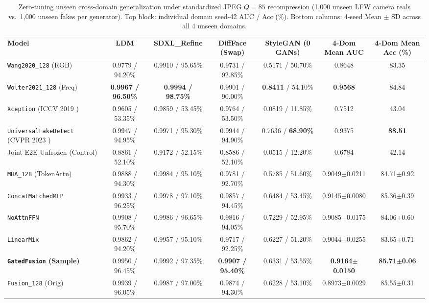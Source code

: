 \documentclass[fleqn,10pt]{wlscirep}
\begin{document}
\begin{table}[tbp]
\centering
\caption{Zero-tuning unseen cross-domain generalization under standardized JPEG $Q=85$ recompression (1,000 unseen LFW camera reals vs.\ 1,000 unseen fakes per generator). Top block: individual domain seed-42 AUC / Acc (\%). Bottom columns: 4-seed Mean $\pm$ SD across all 4 unseen domains.}
\label{tab:unseen}
\scriptsize
\begin{tabular}{@{}lcccccc@{}}
\toprule
\textbf{Model} & \textbf{LDM} & \textbf{SDXL\_Refine} & \textbf{DiffFace (Swap)} & \textbf{StyleGAN (0 GANs)} & \textbf{4-Dom Mean AUC} & \textbf{4-Dom Mean Acc (\%)} \\
\midrule
\texttt{Wang2020\_128} (RGB) & 0.9779 / 94.20\% & 0.9910 / 95.65\% & 0.9731 / 92.85\% & 0.5171 / 50.70\% & 0.8648 & 83.35 \\
\texttt{Wolter2021\_128} (Freq) & \textbf{0.9967 / 96.50\%} & \textbf{0.9994 / 98.75\%} & 0.9901 / 90.00\% & \textbf{0.8411} / 54.10\% & \textbf{0.9568} & 84.84 \\
\texttt{Xception} (ICCV 2019 \cite{ref12,ref28}) & 0.9605 / 53.35\% & 0.9859 / 53.45\% & 0.9764 / 53.50\% & 0.0819 / 11.85\% & 0.7512 & 43.04 \\
\texttt{UniversalFakeDetect} (CVPR 2023 \cite{ref41}) & 0.9947 / 94.95\% & 0.9971 / 95.30\% & 0.9944 / 94.90\% & 0.7636 / \textbf{68.90\%} & 0.9375 & \textbf{88.51} \\
Joint E2E Unfrozen (Control) & 0.8861 / 52.10\% & 0.9172 / 52.15\% & 0.8586 / 52.10\% & 0.0515 / 12.20\% & 0.6784 & 42.14 \\
\midrule
\texttt{MHA\_128} (TokenAttn) & 0.9888 / 94.30\% & 0.9984 / 95.10\% & 0.9781 / 92.70\% & 0.5785 / 51.60\% & 0.9049$\pm$0.0211 & 84.71$\pm$0.92 \\
\texttt{ConcatMatchedMLP} & 0.9933 / 96.25\% & 0.9978 / 97.10\% & 0.9857 / 94.45\% & 0.6484 / 53.45\% & 0.9145$\pm$0.0080 & 85.36$\pm$0.39 \\
\texttt{NoAttnFFN} & 0.9908 / 95.70\% & 0.9986 / 96.65\% & 0.9816 / 94.05\% & 0.7229 / 52.95\% & 0.9085$\pm$0.0175 & 84.06$\pm$0.60 \\
\texttt{LinearMix} & 0.9862 / 94.20\% & 0.9957 / 95.10\% & 0.9717 / 92.25\% & 0.6227 / 51.20\% & 0.9044$\pm$0.0255 & 83.65$\pm$0.71 \\
\textbf{\texttt{GatedFusion} (Sample)} & 0.9950 / 96.45\% & 0.9992 / 97.35\% & \textbf{0.9907 / 95.40\%} & 0.6331 / 53.55\% & \textbf{0.9164$\pm$0.0150} & \textbf{85.71$\pm$0.06} \\
\texttt{Fusion\_128} (Orig) & 0.9939 / 96.05\% & 0.9987 / 97.00\% & 0.9874 / 94.30\% & 0.6228 / 53.10\% & 0.8973$\pm$0.0029 & 85.55$\pm$0.31 \\
\bottomrule
\end{tabular}
\end{table}
\end{document}
